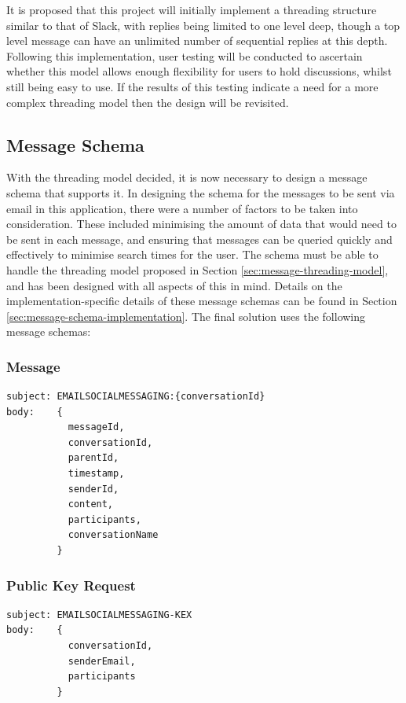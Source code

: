 It is proposed that this project will initially implement a threading structure similar to that of Slack, with replies being limited to one level deep, though a top level message can have an unlimited number of sequential replies at this depth. Following this implementation, user testing will be conducted to ascertain whether this model allows enough flexibility for users to hold discussions, whilst still being easy to use. If the results of this testing indicate a need for a more complex threading model then the design will be revisited.

\subsection{Message Schema} \label{sec:message-schemas}
With the threading model decided, it is now necessary to design a message schema that supports it. In designing the schema for the messages to be sent via email in this application, there were a number of factors to be taken into consideration. These included minimising the amount of data that would need to be sent in each message, and ensuring that messages can be queried quickly and effectively to minimise search times for the user. The schema must be able to handle the threading model proposed in Section \ref{sec:message-threading-model}, and has been designed with all aspects of this in mind. Details on the implementation-specific details of these message schemas can be found in Section \ref{sec:message-schema-implementation}. The final solution uses the following message schemas:

\subsubsection{Message}
\begin{verbatim}
subject: EMAILSOCIALMESSAGING:{conversationId}
body:    {
           messageId,
           conversationId,
           parentId,
           timestamp,
           senderId,
           content,
           participants,
           conversationName
         }
\end{verbatim}

\subsubsection{Public Key Request}
\begin{verbatim}
subject: EMAILSOCIALMESSAGING-KEX
body:    {
           conversationId,
           senderEmail,
           participants
         }
\end{verbatim}

